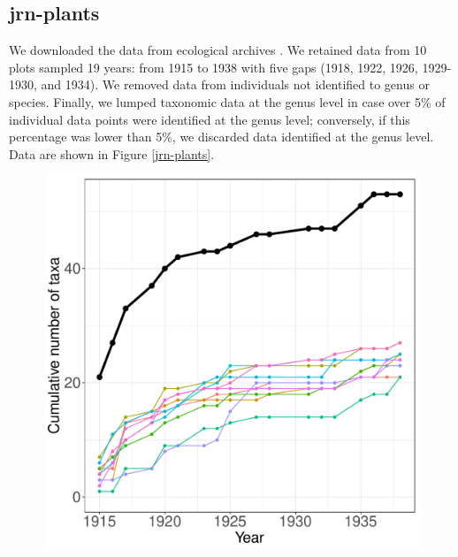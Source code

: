\documentclass[11pt, oneside]{article}
\begin{document}
\subsection{jrn-plants}
We downloaded the data from ecological archives \citep{chapline_jornada_2017}. We retained data from 10 plots sampled 19 years: from 1915 to 1938 with five gaps (1918, 1922, 1926, 1929-1930, and 1934). We removed data from individuals not identified to genus or species. Finally, we lumped taxonomic data at the genus level in case over 5\% of individual data points were identified at the genus level; conversely, if this percentage was lower than 5\%, we discarded data identified at the genus level. Data are shown in Figure \ref{jrn-plants}.
\begin{figure}[h!]
\centering
\includegraphics[scale = 0.4]{jrn-plants-compagnoni_species_accumulation_curve.pdf}

\end{figure}
\end{document}
